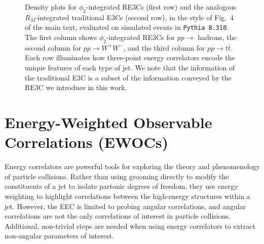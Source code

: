 \begin{figure}[ht!]
{    }
    \caption[Density plots of azimuthally-integrated resolved three-point energy correlators in QCD, \(W\), and top jets.]{
        Density plots for \(\phi_2\)-integrated RE3Cs (first row) and the analogous \(R_M\)-integrated traditional E3Cs (second row), in the style of Fig.~4 of the main text, evaluated on simulated events in \texttt{Pythia 8.310}.
        The first column shows \(\phi_2\)-integrated RE3Cs for \(p p \to \) hadrons, the second column for \(p p \to W^+ W^-\), and the third column for \(p p \to t \bar t\).
        Each row illuminates how three-point energy correlators encode the unique features of each type of jet.
        We note that the information of the traditional E3C is a subset of the information conveyed by the RE3C we introduce in this work.
    }
	\label{fig:pythia_densities}%
\end{figure}




\section{Energy-Weighted Observable Correlations (EWOCs)}
\label{sec:ewocs}

Energy correlators are powerful tools for exploring the theory and phenomenology of particle collisions.
%
Rather than using grooming directly to modify the constituents of a jet to isolate partonic degrees of freedom, they use energy weighting to highlight correlations between the high-energy structures within a jet.
%
However, the EEC is limited to probing angular correlations, and angular correlations are not the only correlations of interest in particle collisions.
%
Additional, non-trivial steps are needed when using energy correlators to extract non-angular parameters of interest.

